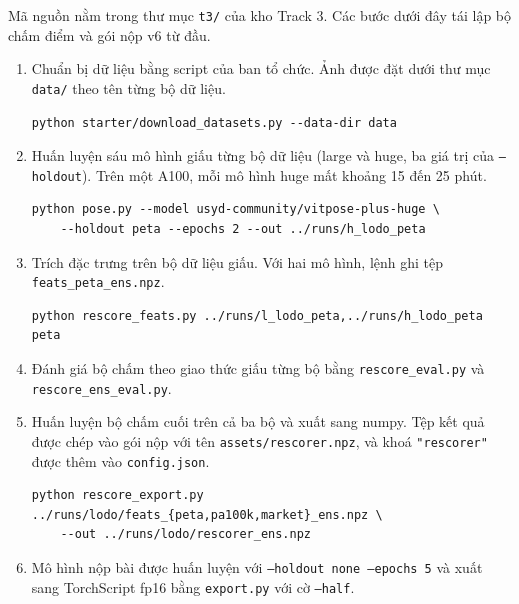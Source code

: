 \documentclass[11pt,a4paper]{article}
\begin{document}
Mã nguồn nằm trong thư mục \texttt{t3/} của kho Track 3. Các bước dưới đây tái lập bộ chấm điểm và gói nộp v6 từ đầu.

\begin{enumerate}[leftmargin=1.6em]
\item Chuẩn bị dữ liệu bằng script của ban tổ chức. Ảnh được đặt dưới thư mục \texttt{data/} theo tên từng bộ dữ liệu.
\begingroup\footnotesize
\begin{verbatim}
python starter/download_datasets.py --data-dir data
\end{verbatim}
\endgroup
\item Huấn luyện sáu mô hình giấu từng bộ dữ liệu (large và huge, ba giá trị của \texttt{--holdout}). Trên một A100, mỗi mô hình huge mất khoảng 15 đến 25 phút.
\begingroup\footnotesize
\begin{verbatim}
python pose.py --model usyd-community/vitpose-plus-huge \
    --holdout peta --epochs 2 --out ../runs/h_lodo_peta
\end{verbatim}
\endgroup
\item Trích đặc trưng trên bộ dữ liệu giấu. Với hai mô hình, lệnh ghi tệp \texttt{feats\_peta\_ens.npz}.
\begingroup\footnotesize
\begin{verbatim}
python rescore_feats.py ../runs/l_lodo_peta,../runs/h_lodo_peta peta
\end{verbatim}
\endgroup
\item Đánh giá bộ chấm theo giao thức giấu từng bộ bằng \texttt{rescore\_eval.py} và \texttt{rescore\_ens\_eval.py}.
\item Huấn luyện bộ chấm cuối trên cả ba bộ và xuất sang numpy. Tệp kết quả được chép vào gói nộp với tên \texttt{assets/rescorer.npz}, và khoá \texttt{"rescorer"} được thêm vào \texttt{config.json}.
\begingroup\footnotesize
\begin{verbatim}
python rescore_export.py ../runs/lodo/feats_{peta,pa100k,market}_ens.npz \
    --out ../runs/lodo/rescorer_ens.npz
\end{verbatim}
\endgroup
\item Mô hình nộp bài được huấn luyện với \texttt{--holdout none --epochs 5} và xuất sang TorchScript fp16 bằng \texttt{export.py} với cờ \texttt{--half}.
\end{enumerate}
\end{document}
